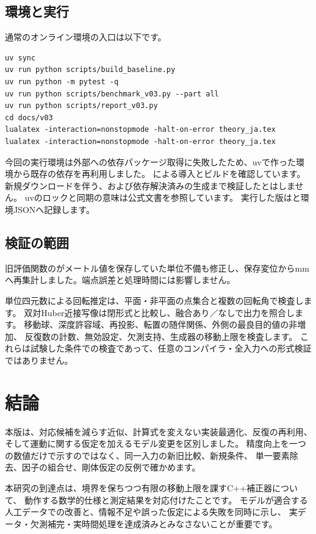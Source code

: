 \documentclass[a4paper,11pt]{ltjsarticle}
\theoremstyle{definition}
\begin{document}
\subsection{環境と実行}
通常のオンライン環境の入口は以下です。
\begin{lstlisting}
uv sync
uv run python scripts/build_baseline.py
uv run python -m pytest -q
uv run python scripts/benchmark_v03.py --part all
uv run python scripts/report_v03.py
cd docs/v03
lualatex -interaction=nonstopmode -halt-on-error theory_ja.tex
lualatex -interaction=nonstopmode -halt-on-error theory_ja.tex
\end{lstlisting}
今回の実行環境は外部への依存パッケージ取得に失敗したため、uvで作った環境から既存の依存を再利用しました。
による導入とビルドを確認しています。
新規ダウンロードを伴う、および依存解決済みの生成まで検証したとはしません。
uvのロックと同期の意味は公式文書\cite{uv}を参照しています。
実行した版はと環境JSONへ記録します。

\subsection{検証の範囲}

旧評価関数のがメートル値を保存していた単位不備も修正し、保存変位からmmへ再集計しました。端点誤差と処理時間には影響しません。

単位四元数による回転推定は、平面・非平面の点集合と複数の回転角で検査します。
双対Huber近接写像は閉形式と比較し、融合あり／なしで出力を照合します。
移動球、深度許容域、再投影、転置の随伴関係、外側の最良目的値の非増加、
反復数の計数、無効設定、欠測支持、生成器の移動上限を検査します。
これらは試験した条件での検査であって、任意のコンパイラ・全入力への形式検証ではありません。

\section{結論}
本版は、対応候補を減らす近似、計算式を変えない実装最適化、反復の再利用、
そして運動に関する仮定を加えるモデル変更を区別しました。
精度向上を一つの数値だけで示すのではなく、同一入力の新旧比較、新規条件、
単一要素除去、因子の組合せ、剛体仮定の反例で確かめます。

本研究の到達点は、境界を保ちつつ有限の移動上限を課すC++補正器について、
動作する数学的仕様と測定結果を対応付けたことです。
モデルが適合する人工データでの改善と、情報不足や誤った仮定による失敗を同時に示し、
実データ・欠測補完・実時間処理を達成済みとみなさないことが重要です。
\end{document}
